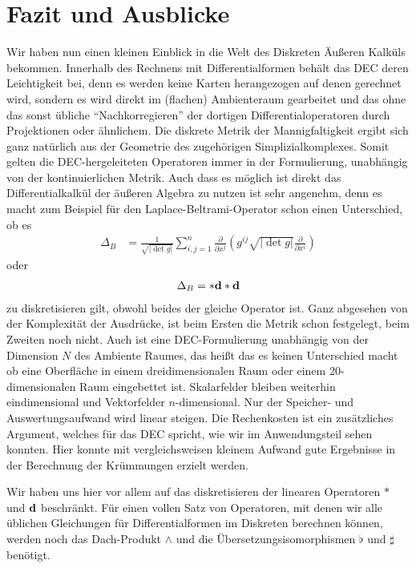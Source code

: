 \chapter{Fazit und Ausblicke}

Wir haben nun einen kleinen Einblick in die Welt des Diskreten Äußeren Kalküls bekommen.
Innerhalb des Rechnens mit Differentialformen behält das DEC deren Leichtigkeit bei,
denn es werden keine Karten herangezogen auf denen gerechnet wird, sondern es wird direkt im (flachen) Ambienteraum gearbeitet und das ohne
das sonst übliche "`Nachkorregieren"' der dortigen Differentialoperatoren durch Projektionen oder ähnlichem.
Die diskrete Metrik der Mannigfaltigkeit ergibt sich ganz natürlich aus der Geometrie des zugehörigen Simplizialkomplexes.
Somit gelten die DEC-hergeleiteten Operatoren immer in der Formulierung, unabhängig von der kontinuierlichen Metrik.
Auch dass es möglich ist direkt das Differentialkalkül der äußeren Algebra zu nutzen ist sehr angenehm, denn es macht zum Beispiel für den
Laplace-Beltrami-Operator schon einen Unterschied, ob es 
    \begin{align}
      \Delta_{B} &= \frac{1}{\sqrt{\left| \det g \right|}} \sum_{i,j=1}^{n} \frac{\partial}{\partial x^{j}} \left( g^{ij}\sqrt{\left| \det g \right|} \frac{\partial }{\partial x^{i}}
      \right)
    \end{align}
oder
  \begin{align}
    \Delta_{B} = *\mathbf{d} *\mathbf{d}
  \end{align}
zu diskretisieren gilt, obwohl beides der gleiche Operator ist.
Ganz abgesehen von der Komplexität der Ausdrücke, ist beim Ersten die Metrik schon festgelegt, beim Zweiten noch nicht.
Auch ist eine DEC-Formulierung unabhängig von der Dimension \( N \) des Ambiente Raumes, das heißt das es keinen Unterschied macht ob eine
Oberfläche in einem dreidimensionalen Raum oder einem 20-dimensionalen Raum eingebettet ist.
Skalarfelder bleiben weiterhin eindimensional und Vektorfelder \( n \)-dimensional.
Nur der Speicher- und Auswertungsaufwand wird linear steigen.
Die Rechenkosten ist ein zusätzliches Argument, welches für das DEC spricht, wie wir im Anwendungsteil sehen konnten.
Hier konnte mit vergleichsweisen kleinem Aufwand gute Ergebnisse in der Berechnung der Krümmungen erzielt werden.

Wir haben uns hier vor allem auf das diskretisieren der linearen Operatoren \( * \) und \( \mathbf{d} \) beschränkt.
Für einen vollen Satz von Operatoren, mit denen wir alle üblichen Gleichungen für Differentialformen im Diskreten berechnen können, werden noch
das Dach-Produkt \( \wedge  \) und die Übersetzungsisomorphismen \( \flat \) und \( \sharp \) benötigt.

